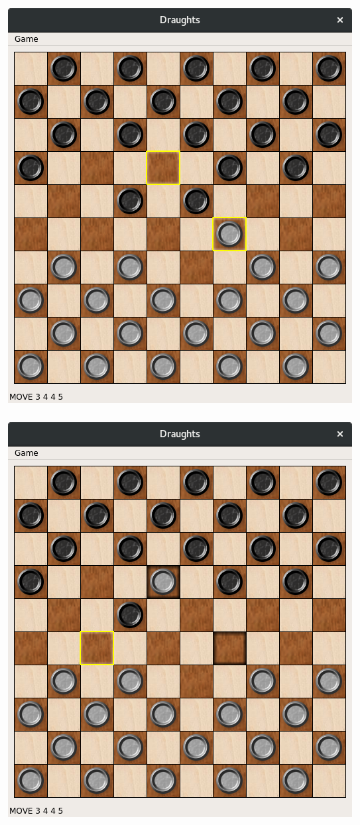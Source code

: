 \documentclass[11pt,a4paper]{article}
\begin{document}
\begin{figure}[H]
\begin{subfigure}{.24\textwidth}
		\includegraphics[width=\linewidth]{img8.png}
		\caption{}
	\end{subfigure}
	\hfill
	\begin{subfigure}{.24\textwidth}
		\centering
		\includegraphics[width=\linewidth]{img9.png}

\end{subfigure}
\end{figure}
\end{document}
